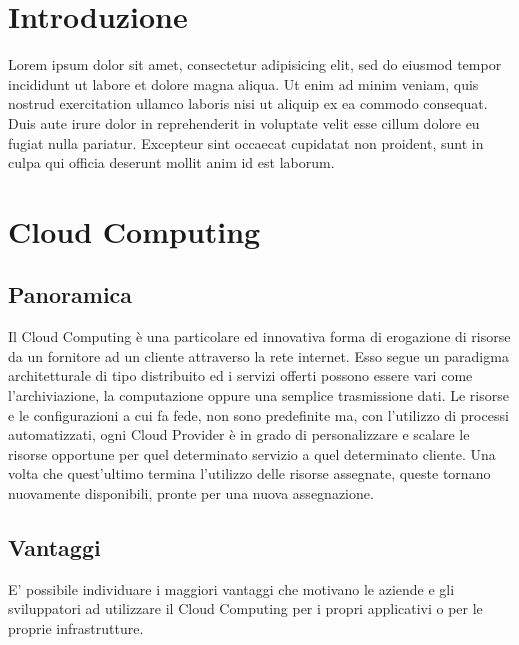 
\section{Introduzione}
Lorem ipsum dolor sit amet, consectetur adipisicing elit, sed do eiusmod
tempor incididunt ut labore et dolore magna aliqua. Ut enim ad minim veniam,
quis nostrud exercitation ullamco laboris nisi ut aliquip ex ea commodo
consequat. Duis aute irure dolor in reprehenderit in voluptate velit esse
cillum dolore eu fugiat nulla pariatur. Excepteur sint occaecat cupidatat non
proident, sunt in culpa qui officia deserunt mollit anim id est laborum.

\section{Cloud Computing}
\subsection{Panoramica}
Il Cloud Computing è una particolare ed innovativa forma di erogazione di risorse da un fornitore ad un cliente attraverso la rete internet. Esso segue un paradigma architetturale di tipo distribuito ed i servizi offerti possono essere vari come l'archiviazione, la computazione oppure una semplice trasmissione dati.
Le risorse e le configurazioni a cui fa fede, non sono predefinite ma, con l'utilizzo di processi automatizzati, ogni
 Cloud Provider è in grado di personalizzare e scalare le risorse opportune per quel determinato servizio a quel determinato cliente. Una volta che quest'ultimo termina l'utilizzo delle risorse assegnate, queste tornano nuovamente disponibili, pronte per una nuova assegnazione.

\subsection{Vantaggi}
E' possibile individuare i maggiori vantaggi che motivano le aziende e gli sviluppatori ad utilizzare il Cloud Computing per i propri applicativi o per le proprie infrastrutture.
